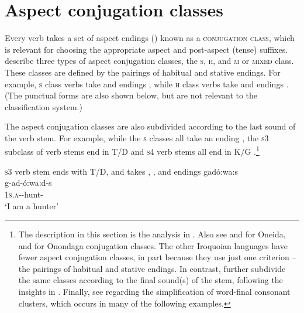 \section{Aspect conjugation classes} \label{Aspect conjugation classes}
Every verb takes a set of aspect endings () known as a \textsc{conjugation class}, which is relevant for choosing the appropriate aspect and post-aspect (tense) suffixes. \citet{sasse_far_1998} describe three types of aspect conjugation classes, the \textsc{s}, \textsc{h}, and \textsc{m} or \textsc{mixed} class. These classes are defined by the pairings of habitual and stative endings. For example, \textsc{s} class verbs take  \textsc{\habitual} and  \textsc{\stative} endings , while \textsc{h} class verbs take  \textsc{\habitual} and  \textsc{\stative} endings . (The punctual forms are also shown below, but are not relevant to the classification system.)

The aspect conjugation classes are also subdivided according to the last sound of the verb stem. For example, while the \textsc{s} classes all take an  {\habitual} ending , the \textsc{s3} subclass of verb stems end in T/D  and \textsc{s4} verb stems all end in K/G .\footnote{The description in this section is the analysis in \citet{sasse_far_1998}. Also see \citet[85]{lounsbury_oneida_1953} and \citet[20, 27]{michelson_oneida-englishenglish_2002} for Oneida, and \citet[89]{woodbury_reference_2018} for Onondaga conjugation classes. The other Iroquoian languages have fewer aspect conjugation classes, in part because they use just one criterion -- the pairings of habitual and stative endings. In contrast, \citet{sasse_far_1998} further subdivide the same classes according to the final sound(s) of the stem, following the insights in \citet{michelson_mohawk_1975}. Finally, see  regarding the simplification of word-final consonant clusters, which occurs in many of the following examples.}

\ea\label{ex:aspclass1} \textsc{s3} verb stem ends with T/D, and takes  {\habitual},  {\zeropunctual}, and  {\stative} endings
\ea gadó:wa:s\\
\gll g-ad-ó:wa:d-s\\
 \textsc{1s.a}-{\semireflexive}-hunt-{\habitual}\\
\glt `I am a hunter'

